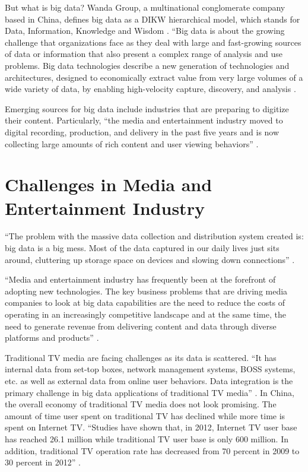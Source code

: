 \documentclass[sigconf]{acmart}
\begin{document}
But what is big data? Wanda Group, a multinational conglomerate company based in China, defines big data as a DIKW hierarchical model, which stands for Data, Information, Knowledge and Wisdom \cite{Zhang2017era}. ``Big data is about the growing challenge that organizations face as they deal with large and fast-growing sources of data or information that also present a complex range of analysis and use problems. Big data technologies describe a new generation of technologies and architectures, designed to economically extract value from very large volumes of a wide variety of data, by enabling high-velocity capture, discovery, and analysis \cite{Villars2011care}.

Emerging sources for big data include industries that are preparing to digitize their content. Particularly, ``the media and entertainment industry moved to digital recording, production, and delivery in the past five years and is now collecting large amounts of rich content and user viewing behaviors'' \cite{Villars2011care}.

\section{Challenges in Media and Entertainment Industry}

``The problem with the massive data collection and distribution system created is: big data is a big mess. Most of the data captured in our daily lives just sits around, cluttering up storage space on devices and slowing down connections'' \cite{Schlieski2012data}.

``Media and entertainment industry has frequently been at the forefront of adopting new technologies. The key business problems that are driving media companies to look at big data capabilities are the need to reduce the costs of operating in an increasingly competitive landscape and at the same time, the need to generate revenue from delivering content and data through diverse platforms and products'' \cite{Lippell2016sectors}.

Traditional TV media are facing challenges as its data is scattered. ``It has internal data from set-top boxes, network management systems, BOSS systems, etc. as well as external data from online user behaviors. Data integration is the primary challenge in big data applications of traditional TV media'' \cite{Zhang2017era}. In China, the overall economy of traditional TV media does not look promising. The amount of time user spent on traditional TV has declined while more time is spent on Internet TV. ``Studies have shown that, in 2012, Internet TV user base has reached 26.1 million while traditional TV user base is only 600 million. In addition, traditional TV operation rate has decreased from 70 percent in 2009 to 30 percent in 2012'' \cite{Zhang2017era}. 
\end{document}
